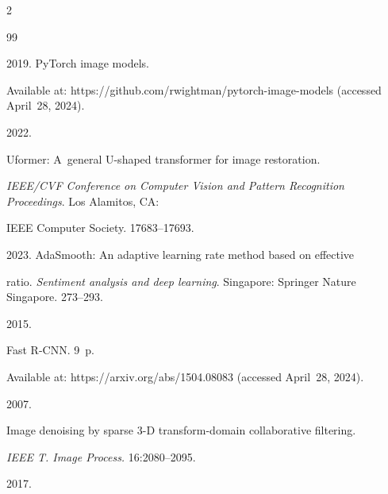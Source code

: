 \begin{multicols}{2}
{{\begin{thebibliography}{99}


     2019. PyTorch image models.


    Available at: {\sf https://github.com/rwightman/pytorch-image-models} (accessed April~28, 2024).


   




     2022.


    Uformer: A~general U-shaped transformer for image restoration. 


\textit{IEEE/CVF Conference on Computer Vision and Pattern Recognition Proceedings}. Los Alamitos, CA:


 IEEE Computer Society. 17683--17693.


    




     2023. AdaSmooth: An adaptive learning rate method based on effective


    ratio. \textit{Sentiment analysis and deep learning}.  Singapore: Springer Nature Singapore. 273--293.


    





   




     2015.


    Fast {R-CNN}. 9~p.  


    Available at: {\sf https://arxiv.org/abs/1504.08083} (accessed April~28, 2024).


    




     2007.


    Image denoising by sparse 3-D transform-domain collaborative filtering. 


    \textit{IEEE T. Image Process.}  16:2080--2095.


    




     2017.



\end{thebibliography}}}
\end{multicols}
